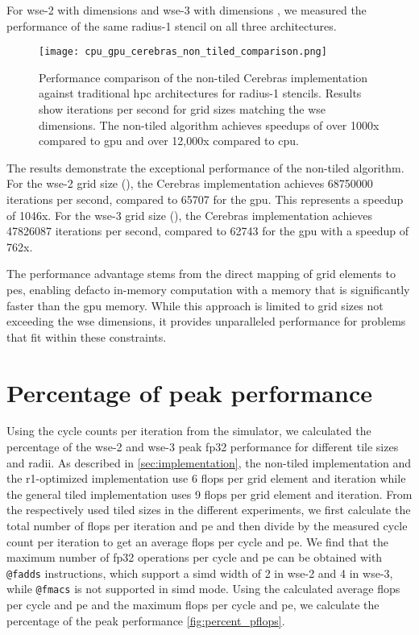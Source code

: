 For \ac{wse}-2 with dimensions  and \ac{wse}-3 with dimensions , we measured the performance of the same radius-1 stencil on all three architectures.

\begin{figure}[h]
    \centering
    \texttt{[image: cpu\_gpu\_cerebras\_non\_tiled\_comparison.png]}
    \caption{Performance comparison of the non-tiled Cerebras implementation against traditional \ac{hpc} architectures for radius-1 stencils. Results show iterations per second for grid sizes matching the \ac{wse} dimensions. The non-tiled algorithm achieves speedups of over 1000x compared to \ac{gpu} and over 12,000x compared to \ac{cpu}.}
    \label{fig:cpu_gpu_cerebras_non_tiled_comparison}
\end{figure}

The results demonstrate the exceptional performance of the non-tiled algorithm. For the \ac{wse}-2 grid size (), the Cerebras implementation achieves \num{68750000} iterations per second, compared to \num{65707} for the \ac{gpu}. This represents a speedup of 1046x.
For the \ac{wse}-3 grid size (), the Cerebras implementation achieves \num{47826087} iterations per second, compared to \num{62743} for the \ac{gpu} with a speedup of 762x.

The performance advantage stems from the direct mapping of grid elements to \acp{pe}, enabling defacto in-memory computation with a memory that is significantly faster than the \ac{gpu} memory. While this approach is limited to grid sizes not exceeding the \ac{wse} dimensions, it provides unparalleled performance for problems that fit within these constraints.

\section{Percentage of peak performance}
Using the cycle counts per iteration from the simulator, we calculated the percentage of the \ac{wse}-2 and \ac{wse}-3 peak fp32 performance for different tile sizes and radii.
As described in \autoref{sec:implementation}, the non-tiled implementation and the r1-optimized implementation use \num{6} flops per grid element and iteration while the general tiled implementation uses \num{9} flops per grid element and iteration. From the respectively used tiled sizes in the different experiments, we first calculate the total number of flops per iteration and \ac{pe} and then divide by the measured cycle count per iteration to get an average flops per cycle and \ac{pe}. We find that the maximum number of fp32 operations per cycle and \ac{pe} can be obtained with \texttt{@fadds} instructions, which support a simd width of 2 in \ac{wse}-2 and 4 in \ac{wse}-3, while \texttt{@fmacs} is not supported in simd mode. Using the calculated average flops per cycle and \ac{pe} and the maximum flops per cycle and \ac{pe}, we calculate the percentage of the peak performance \autoref{fig:percent_pflops}.

